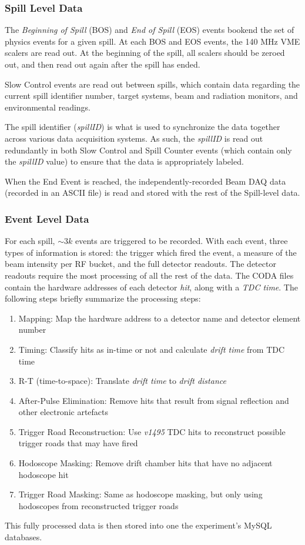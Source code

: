 \subsubsection{Spill Level Data}
The \emph{Beginning of Spill} (BOS) and \emph{End of Spill} (EOS) events bookend the set of physics events for a given spill. At each BOS and EOS events, the 140 MHz VME scalers are read out. At the beginning of the spill, all scalers should be zeroed out, and then read out again after the spill has ended.

Slow Control events are read out between spills, which contain data regarding the current spill identifier number, target systems, beam and radiation monitors, and environmental readings.

The spill identifier (\emph{spillID}) is what is used to synchronize the data together across various data acquisition systems. As such, the \emph{spillID} is read out redundantly in both Slow Control and Spill Counter events (which contain only the \emph{spillID} value) to ensure that the data is appropriately labeled.

When the End Event is reached, the independently-recorded Beam DAQ data (recorded in an ASCII file) is read and stored with the rest of the Spill-level data.

\subsubsection{Event Level Data}
For each spill, $\sim3k$ events are triggered to be recorded. With each event, three types of information is stored: the trigger which fired the event, a measure of the beam intensity per RF bucket, and the full detector readouts.
The detector readouts require the most processing of all the rest of the data. The CODA files contain the hardware addresses of each detector \emph{hit}, along with a \emph{TDC time}. The following steps briefly summarize the processing steps:
\begin{enumerate}
	\item Mapping: Map the hardware address to a detector name and detector element number
	\item Timing: Classify hits as in-time or not and calculate \emph{drift time} from TDC time
	\item R-T (time-to-space): Translate \emph{drift time} to \emph{drift distance}
	\item After-Pulse Elimination: Remove hits that result from signal reflection and other electronic artefacts
	\item Trigger Road Reconstruction: Use \emph{v1495} TDC hits to reconstruct possible trigger roads that may have fired
	\item Hodoscope Masking: Remove drift chamber hits that have no adjacent hodoscope hit
	\item Trigger Road Masking: Same as hodoscope masking, but only using hodoscopes from reconstructed trigger roads
\end{enumerate}
This fully processed data is then stored into one the experiment's MySQL databases.


